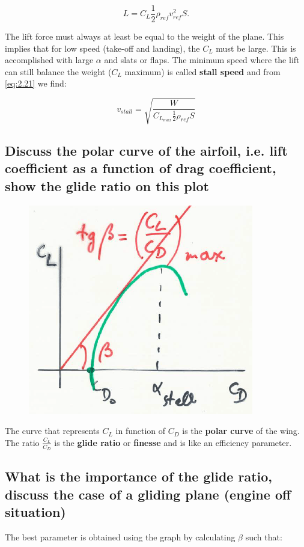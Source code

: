 \documentclass[british,french,11pt, a4paper, openany]{article}
\begin{document}
\begin{equation}
L = C_L \frac{1}{2} \rho _{ref} v^2_{ref} S.
\label{eq:2.21}
\end{equation}

The lift force must always at least be equal to the weight of the plane. This implies that for low speed (take-off and landing), the $C_L$ must be large. This is accomplished with large $\alpha$ and slats or flaps. The minimum speed where the lift can still balance the weight ($C_L$ maximum) is called \textbf{stall speed} and from \eqref{eq:2.21} we find:

\begin{equation}
v_{stall} = \sqrt{\frac{W}{C_{L_{max}} \frac{1}{2} \rho_{ref} S}}
\end{equation}

\subsection{Discuss the polar curve of the airfoil, i.e. lift coefficient as a function of drag
	coefficient, show the glide ratio on this plot}
\begin{figure}
	\vspace{-5mm}
	\includegraphics[scale=0.3]{ch2/21}
\end{figure}
The curve that represents $C_L$ in function of $C_D$ is the \textbf{polar curve} of the wing. The ratio $\frac{C_L}{C_D}$ is the \textbf{glide ratio} or \textbf{finesse} and is like an efficiency parameter. 
\subsection{What is the importance of the glide ratio, discuss the case of a gliding plane
	(engine off situation)}
The best parameter is obtained using the graph by calculating $\beta$ such that: 
\end{document}
